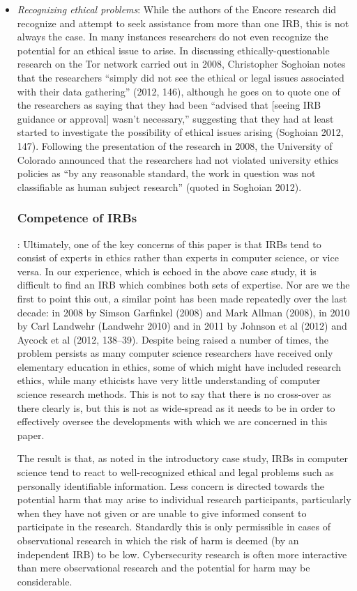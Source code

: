 \documentclass{svjour3}                     %
\begin{document}
\begin{itemize}
\item\emph{Recognizing ethical problems}:
While the authors of the Encore research did recognize and attempt to seek assistance from more than one IRB, this is not always the case. In many instances researchers do not even recognize the potential for an ethical issue to arise. In discussing ethically-questionable research on the Tor network carried out in 2008, Christopher Soghoian notes that the researchers “simply did not see the ethical or legal issues associated with their data gathering” (2012, 146), although he goes on to quote one of the researchers as saying that they had been “advised that [seeing IRB guidance or approval] wasn’t necessary,” suggesting that they had at least started to investigate the possibility of ethical issues arising (Soghoian 2012, 147). Following the presentation of the research in 2008, the University of Colorado announced that the researchers had not violated university ethics policies as “by any reasonable standard, the work in question was not classifiable as human subject research” (quoted in Soghoian 2012).

\subsubsection{Competence of IRBs}:
Ultimately, one of the key concerns of this paper is that IRBs tend to consist of experts in ethics rather than experts in computer science, or vice versa.  In our experience, which is echoed in the above case study, it is difficult to find an IRB which combines both sets of expertise. Nor are we the first to point this out, a similar point has been made repeatedly over the last decade: in 2008 by Simson Garfinkel (2008) and Mark Allman (2008), in 2010 by Carl Landwehr (Landwehr 2010) and in 2011 by Johnson et al (2012) and Aycock et al (2012, 138–39). Despite being raised a number of times, the problem persists as many computer science researchers have received only elementary education in ethics, some of which might have included research ethics, while many ethicists have very little understanding of computer science research methods. This is not to say that there is no cross-over as there clearly is, but this is not as wide-spread as it needs to be in order to effectively oversee the developments with which we are concerned in this paper.

The result is that, as noted in the introductory case study, IRBs in computer science tend to react to well-recognized ethical and legal problems such as personally identifiable information. Less concern is directed towards the potential harm that may arise to individual research participants, particularly when they have not given or are unable to give informed consent to participate in the research. Standardly this is only permissible in cases of observational research in which the risk of harm is deemed (by an independent IRB) to be low. Cybersecurity research is often more interactive than mere observational research and the potential for harm may be considerable.
\end{itemize}
\end{document}
